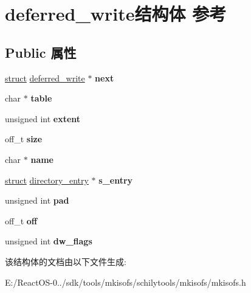 \hypertarget{structdeferred__write}{}\section{deferred\+\_\+write结构体 参考}
\label{structdeferred__write}
\subsection*{Public 属性}
\begin{DoxyCompactItemize}
\item 
\mbox{\label{structdeferred__write_a6409cb9dc5dc6c643ac306854aca98c6}} 
\hyperlink{interfacestruct}{struct} \hyperlink{structdeferred__write}{deferred\+\_\+write} $\ast$ {\bfseries next}
\item 
\mbox{\label{structdeferred__write_ad7d0958c8f1e7c78d1fcb0f4871f46f2}} 
char $\ast$ {\bfseries table}
\item 
\mbox{\label{structdeferred__write_a7cf5f0a7f91755a63998c43119499234}} 
unsigned int {\bfseries extent}
\item 
\mbox{\label{structdeferred__write_a53c584f33f1fbfa96215fccc829fd030}} 
off\+\_\+t {\bfseries size}
\item 
\mbox{\label{structdeferred__write_aac5889d75426c6ca71c788ae1487f20e}} 
char $\ast$ {\bfseries name}
\item 
\mbox{\label{structdeferred__write_a49c9df6dfb706c0e2f0c896b9aff6103}} 
\hyperlink{interfacestruct}{struct} \hyperlink{structdirectory__entry}{directory\+\_\+entry} $\ast$ {\bfseries s\+\_\+entry}
\item 
\mbox{\label{structdeferred__write_a0b42a916aca1ceee856cccc40fffb13f}} 
unsigned int {\bfseries pad}
\item 
\mbox{\label{structdeferred__write_a1b4203ae4d76e84ba6ff7b91fa1cc0bd}} 
off\+\_\+t {\bfseries off}
\item 
\mbox{\label{structdeferred__write_a42cd84aa1a37c39e93568f4f51a691ec}} 
unsigned int {\bfseries dw\+\_\+flags}
\end{DoxyCompactItemize}


该结构体的文档由以下文件生成\+:\begin{DoxyCompactItemize}
\item 
E\+:/\+React\+O\+S-\/0../sdk/tools/mkisofs/schilytools/mkisofs/mkisofs.\+h\end{DoxyCompactItemize}
